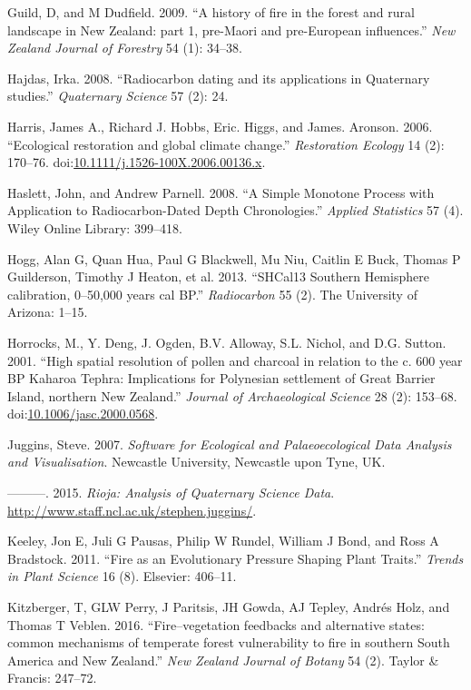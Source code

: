 \documentclass[]{article}
\begin{document}
Guild, D, and M Dudfield. 2009. ``A history of fire in the forest and rural landscape in New Zealand: part 1, pre-Maori and pre-European influences.'' \emph{New Zealand Journal of Forestry} 54 (1): 34--38.

Hajdas, Irka. 2008. ``Radiocarbon dating and its applications in Quaternary studies.'' \emph{Quaternary Science} 57 (2): 24.

Harris, James A., Richard J. Hobbs, Eric. Higgs, and James. Aronson. 2006. ``Ecological restoration and global climate change.'' \emph{Restoration Ecology} 14 (2): 170--76. doi:\href{https://doi.org/10.1111/j.1526-100X.2006.00136.x}{10.1111/j.1526-100X.2006.00136.x}.

Haslett, John, and Andrew Parnell. 2008. ``A Simple Monotone Process with Application to Radiocarbon-Dated Depth Chronologies.'' \emph{Applied Statistics} 57 (4). Wiley Online Library: 399--418.

Hogg, Alan G, Quan Hua, Paul G Blackwell, Mu Niu, Caitlin E Buck, Thomas P Guilderson, Timothy J Heaton, et al. 2013. ``SHCal13 Southern Hemisphere calibration, 0--50,000 years cal BP.'' \emph{Radiocarbon} 55 (2). The University of Arizona: 1--15.

Horrocks, M., Y. Deng, J. Ogden, B.V. Alloway, S.L. Nichol, and D.G. Sutton. 2001. ``High spatial resolution of pollen and charcoal in relation to the c. 600 year BP Kaharoa Tephra: Implications for Polynesian settlement of Great Barrier Island, northern New Zealand.'' \emph{Journal of Archaeological Science} 28 (2): 153--68. doi:\href{https://doi.org/10.1006/jasc.2000.0568}{10.1006/jasc.2000.0568}.

Juggins, Steve. 2007. \emph{Software for Ecological and Palaeoecological Data Analysis and Visualisation}. Newcastle University, Newcastle upon Tyne, UK.

---------. 2015. \emph{Rioja: Analysis of Quaternary Science Data}. \url{http://www.staff.ncl.ac.uk/stephen.juggins/}.

Keeley, Jon E, Juli G Pausas, Philip W Rundel, William J Bond, and Ross A Bradstock. 2011. ``Fire as an Evolutionary Pressure Shaping Plant Traits.'' \emph{Trends in Plant Science} 16 (8). Elsevier: 406--11.

Kitzberger, T, GLW Perry, J Paritsis, JH Gowda, AJ Tepley, Andrés Holz, and Thomas T Veblen. 2016. ``Fire--vegetation feedbacks and alternative states: common mechanisms of temperate forest vulnerability to fire in southern South America and New Zealand.'' \emph{New Zealand Journal of Botany} 54 (2). Taylor \& Francis: 247--72.
\end{document}
